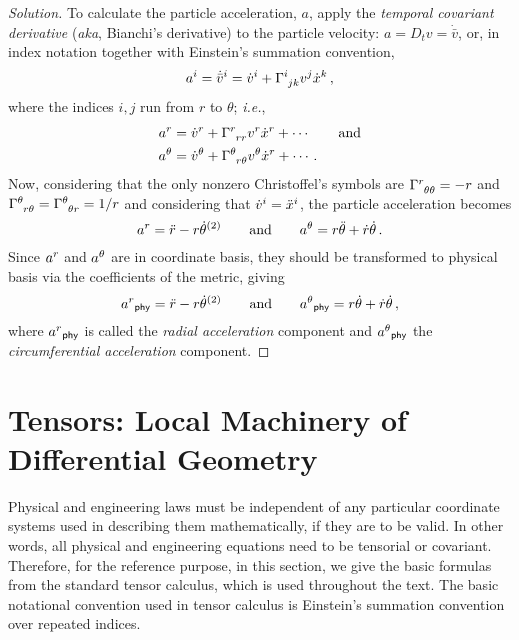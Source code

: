\documentclass[aps,pra,10pt,a4paper]{revtex4-1}
\theoremstyle{plain}
\theoremstyle{definition}
\theoremstyle{remark}
\newenvironment{solution}{\begin{proof}[Solution]}{\end{proof}}
\providecommand*{\lingo}[1]{\textsl{#1}}
\providecommand*{\lingform}[1]{\textit{#1}}
\providecommand*{\aka}{\lingform{aka}}
\providecommand*{\ie}{\lingform{i.e.}}
\providecommand*{\acc}{a} %
\providecommand*{\pos}{x} %
\providecommand*{\vel}{v} %
\providecommand*{\dt}[1]{\dot{#1}}          %
\providecommand*{\ddt}[1]{\ddot{#1}}        %
\providecommand*{\bder}{D_t}                %
\providecommand*{\dbder}[1]{\dot{\bar{#1}}} %
\providecommand*{\cvec}[2]{\tensor{#1}{^{#2}}} %
\providecommand*{\skchris}[3]{\tensor{\Gamma}{^{#1}_{#2}_{#3}}} %
\providecommand*{\pxpos}{r}      %
\providecommand*{\pypos}{\theta} %
\providecommand*{\parens}[1]{\mleft({#1}\mright)}               %
\providecommand*{\sbtxt}[1]{_\text{\textsf{#1}}}                %
\providecommand*{\spexp}[1]{^{\parens{#1}}}                     %
\begin{document}
\begin{solution}
To calculate the particle acceleration, $\acc$, apply the \lingo{temporal covariant derivative} (\aka, Bianchi's derivative) to the particle velocity: $\acc = \bder\vel = \dbder\vel$, or, in index notation together with Einstein's summation convention,
%
\begin{equation*}
  \cvec\acc i = \cvec{\dbder\vel}{i} 
                = \cvec{\dt\vel}{i} + \skchris ijk\cvec\vel j\cvec{\dt\pos}{k}\,,
\end{equation*}
%
where the indices $i,j$ run from $\pxpos$ to $\pypos$; \ie,
%
\begin{align*}
  \cvec\acc\pxpos &= \cvec{\dt\vel}{\pxpos} + \skchris{\pxpos}{\pxpos}{\pxpos}\cvec\vel\pxpos\cvec{\dt\pos}{\pxpos} + \dotsb \qquad\text{and} \\
  \cvec\acc\pypos &= \cvec{\dt\vel}{\pypos} + \skchris{\pypos}{\pxpos}{\pypos}\cvec\vel\pypos\cvec{\dt\pos}{\pxpos} + \dotsb \,.
\end{align*}
%
Now, considering that the only nonzero Christoffel's symbols are $\skchris{\pxpos}{\pypos}{\pypos} = -\pxpos$ and $\skchris{\pypos}{\pxpos}{\pypos} = \skchris{\pypos}{\pypos}{\pxpos} = 1/r$ and considering that $\cvec{\dt\vel}{i} = \cvec{\ddt\pos}{i}$, the particle acceleration becomes
%
\begin{equation*}
  \cvec\acc\pxpos = \ddt\pxpos - \pxpos\dt\pypos\spexp 2 \qquad\text{and}\qquad
  \cvec\acc\pypos = \pxpos\ddt\pypos + \dt\pxpos\dt\pypos \,.
\end{equation*}
%
Since $\cvec\acc\pxpos$ and $\cvec\acc\pypos$ are in coordinate basis, they should be transformed to physical basis via the coefficients of the metric, giving
%
\begin{equation*}
  \cvec\acc\pxpos\sbtxt{phy} = \ddt\pxpos - \pxpos\dt\pypos\spexp 2 \qquad\text{and}\qquad
  \cvec\acc\pypos\sbtxt{phy} = \pxpos\dt\pypos + \dt\pxpos\dt\pypos                 \,,
\end{equation*}
%
where $\cvec\acc\pxpos\sbtxt{phy}$ is called the \lingo{radial acceleration} component and $\cvec\acc\pypos\sbtxt{phy}$ the \lingo{circumferential acceleration} component.
%
\end{solution}


\section{Tensors: Local Machinery of Differential Geometry}
%
Physical and engineering laws must be independent of any particular coordinate systems used in describing them mathematically, if they are to be valid. In other words, all physical and engineering equations need to be tensorial or covariant. Therefore, for the reference purpose, in this section, we give the basic formulas from the standard tensor calculus, which is used throughout the text. The basic notational convention used in tensor calculus is Einstein's summation convention over repeated indices.
\end{document}
